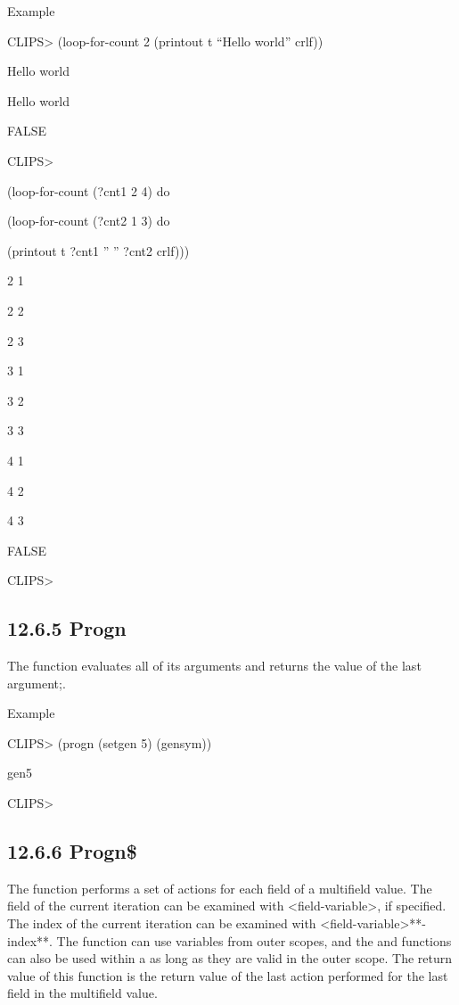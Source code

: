 \documentclass[letterpaper,10pt,english]{sphinxmanual}
\begin{document}
Example

CLIPS\textgreater{} (loop-for-count 2 (printout t “Hello world” crlf))

Hello world

Hello world

FALSE

CLIPS\textgreater{}

(loop-for-count (?cnt1 2 4) do

(loop-for-count (?cnt2 1 3) do

(printout t ?cnt1 ” ” ?cnt2 crlf)))

2 1

2 2

2 3

3 1

3 2

3 3

4 1

4 2

4 3

FALSE

CLIPS\textgreater{}


\subsection{12.6.5 Progn}
\label{\detokenize{actions:progn}}
The  function evaluates all of its arguments and returns the
value of the last argument;.


\begin{sphinxVerbatim}[commandchars=\\\{\}]
 
\end{sphinxVerbatim}

Example

CLIPS\textgreater{} (progn (setgen 5) (gensym))

gen5

CLIPS\textgreater{}


\subsection{12.6.6 Progn\$}
\label{\detokenize{actions:progn-1}}\label{\detokenize{actions:id3}}
The  function performs a set of actions for each field of a
multifield value. The field of the current iteration can be examined
with \textless{}field-variable\textgreater{}, if specified. The index of the current iteration
can be examined with \textless{}field-variable\textgreater{}**-index**. The  function
can use variables from outer scopes, and the  and 
functions can also be used within a  as long as they are valid
in the outer scope. The return value of this function is the return
value of the last action performed for the last field in the multifield
value.
\end{document}
